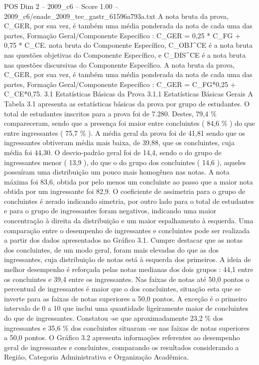 \begin{textsample}{POS Dim 2 – 2009\_c6 – Score 1.00 – 2009\_c6/enade\_2009\_tec\_gastr\_61596a793a.txt}
A nota bruta da prova, C\_GER, por sua vez, é também uma média ponderada da nota de cada uma das partes, Formação Geral/Componente Específico : C\_GER = 0,25 * C\_FG + 0,75 * C\_CE. nota bruta do Componente Específico, C\_OBJ\textasciicircum{}CE é a nota bruta nas questões objetivas do Componente Específico, e C\_DIS\textasciicircum{}CE é a nota bruta nas questões discursivas do Componente Específico.
A nota bruta da prova, C\_GER, por sua vez, é também uma média ponderada da nota de cada uma das partes, Formação Geral/Componente Específico : C\_GER = C\_FG*0,25 + C\_CE*0,75. 3.1 Estatísticas Básicas da Prova 3.1.1 Estatísticas Básicas Gerais A Tabela 3.1 apresenta as estatísticas básicas da prova por grupo de estudantes.
O total de estudantes inscritos para a prova foi de 7.280.
Destes, 79,4 \% compareceram, sendo que a presença foi maior entre concluintes ( 84,6 \% ) do que entre ingressantes ( 75,7 \% ).
A média geral da prova foi de 41,81 sendo que os ingressantes obtiveram média mais baixa, de 39,88, que os concluintes, cuja média foi 44,30.
O desvio-padrão geral foi de 14,4, sendo o do grupo de ingressantes menor ( 13,9 ), do que o do grupo dos concluintes ( 14,6 ), aqueles possuíram uma distribuição um pouco mais homogênea nas notas.
A nota máxima foi 83,6, obtida por pelo menos um concluinte ao passo que a maior nota obtida por um ingressante foi 82,9.
O coeficiente de assimetria para o grupo de concluintes é zerado indicando simetria, por outro lado para o total de estudantes e para o grupo de ingressantes foram negativos, indicando uma maior concentração à direita da distribuição e um maior espalhamento à esquerda.
Uma comparação entre o desempenho de ingressantes e concluintes pode ser realizada a partir dos dados apresentados no Gráfico 3.1.
Cumpre destacar que as notas dos concluintes, de um modo geral, foram mais elevadas do que as dos ingressantes, cuja distribuição de notas está à esquerda dos primeiros.
A ideia de melhor desempenho é reforçada pelas notas medianas dos dois grupos : 44,1 entre os concluintes e 39,4 entre os ingressantes.
Nas faixas de notas até 50,0 pontos o percentual de ingressantes é maior que o dos concluintes, situação esta que se inverte para as faixas de notas superiores a 50,0 pontos.
A exceção é o primeiro intervalo de 0 a 10 que inclui uma quantidade ligeiramente maior de concluintes do que de ingressantes.
Constatou -se que aproximadamente 23,2 \% dos ingressantes e 35,6 \% dos concluintes situaram -se nas faixas de notas superiores a 50,0 pontos.
O Gráfico 3.2 apresenta informações referentes ao desempenho geral de ingressantes e concluintes, comparando os resultados considerando a Região, Categoria Administrativa e Organização Acadêmica.

\end{textsample}
